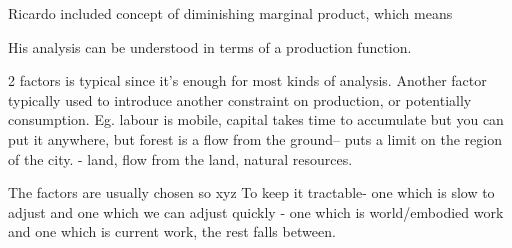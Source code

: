 Ricardo included concept of diminishing marginal product, which means


His analysis can be understood in terms of a production function. 


 2 factors is typical since it's enough for most kinds of analysis. Another factor typically used to introduce another constraint on production, or potentially consumption. Eg. labour is mobile, capital takes time to accumulate but you can put it anywhere, but forest is a flow from the ground-- puts a limit on the region of the city. - land, flow from the land, natural resources.
 
 The factors are usually chosen so xyz
 To keep it tractable- one which is slow to adjust and one which we can adjust quickly - one which is world/embodied work and one which is current work, the rest falls between.

